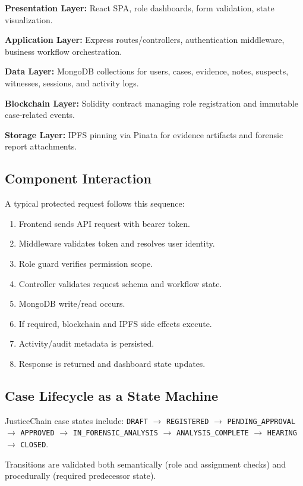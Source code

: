 \documentclass[conference]{IEEEtran}
\begin{document}
\textbf{Presentation Layer:} React SPA, role dashboards, form validation, state visualization.

\textbf{Application Layer:} Express routes/controllers, authentication middleware, business workflow orchestration.

\textbf{Data Layer:} MongoDB collections for users, cases, evidence, notes, suspects, witnesses, sessions, and activity logs.

\textbf{Blockchain Layer:} Solidity contract managing role registration and immutable case-related events.

\textbf{Storage Layer:} IPFS pinning via Pinata for evidence artifacts and forensic report attachments.

\subsection{Component Interaction}
A typical protected request follows this sequence:
\begin{enumerate}
    \item Frontend sends API request with bearer token.
    \item Middleware validates token and resolves user identity.
    \item Role guard verifies permission scope.
    \item Controller validates request schema and workflow state.
    \item MongoDB write/read occurs.
    \item If required, blockchain and IPFS side effects execute.
    \item Activity/audit metadata is persisted.
    \item Response is returned and dashboard state updates.
\end{enumerate}

\subsection{Case Lifecycle as a State Machine}
JusticeChain case states include:
\texttt{DRAFT} $\rightarrow$ \texttt{REGISTERED} $\rightarrow$ \texttt{PENDING\_APPROVAL} $\rightarrow$ \texttt{APPROVED} $\rightarrow$ \texttt{IN\_FORENSIC\_ANALYSIS} $\rightarrow$ \texttt{ANALYSIS\_COMPLETE} $\rightarrow$ \texttt{HEARING} $\rightarrow$ \texttt{CLOSED}.

Transitions are validated both semantically (role and assignment checks) and procedurally (required predecessor state).
\end{document}
